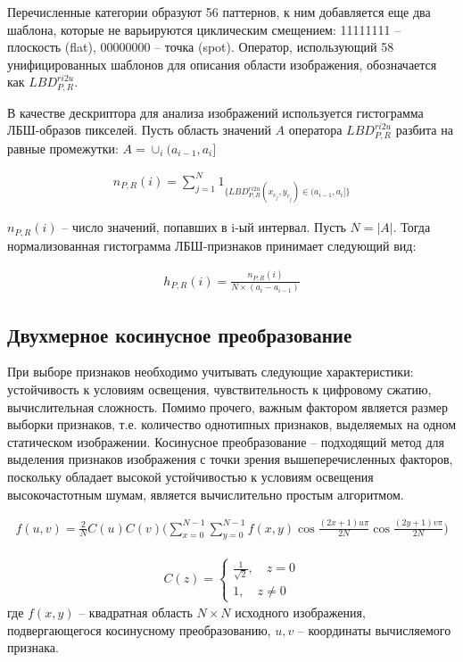 Перечисленные категории образуют 56 паттернов, к ним добавляется еще два шаблона,  которые  не  варьируются  циклическим  смещением:  11111111 --
плоскость  (flat),  00000000 -- точка  (spot).  Оператор,  использующий  58 унифицированных шаблонов для описания области изображения, обозначается как $LBD_{P,R}^{ri2u}$.

В качестве дескриптора для анализа изображений используется гистограмма ЛБШ-образов пикселей. Пусть область значений $A$ оператора $LBD_{P,R}^{ri2u}$ разбита на равные промежутки: 
$ A = \cup_i(a_{i-1},a_i]$

\begin{gather}
n_{P,R}(i)=\sum\limits_{j=1}^{N}1_{\{LBD_{P,R}^{ri2u}(x_{c_j},y_{c_j})\in(a_{i-1},a_i]\}}
\end{gather}

$n_{P,R}(i)$ -- число значений, попавших в i-ый интервал. Пусть $N = |A|$. Тогда нормализованная гистограмма ЛБШ-признаков принимает следующий вид:

\begin{gather}
h_{P,R}(i)=\frac{n_{P,R}(i)}{N \times (a_i - a_{i-1})}
\end{gather}

\subsection{Двухмерное косинусное преобразование}

При выборе признаков необходимо учитывать следующие характеристики: устойчивость к условиям освещения, чувствительность к цифровому сжатию, вычислительная сложность. Помимо прочего, важным фактором является размер выборки признаков, т.е. количество однотипных признаков, выделяемых на одном статическом изображении. Косинусное преобразование – подходящий метод для выделения признаков изображения с точки зрения вышеперечисленных факторов, поскольку обладает высокой устойчивостью к условиям освещения высокочастотным шумам, является вычислительно простым алгоритмом.

\begin{gather}
f(u, v) = \frac{2}{N} C(u)C(v)\Big(\sum\limits_{x=0}^{N-1}\sum\limits_{y=0}^{N-1}f(x, y) \cos \frac{(2x+1)u\pi}{2N} \cos \frac{(2y+1)v\pi}{2N} \Big)
\end{gather}

\begin{gather}
C(z) =
  \begin{cases}
    \frac{1}{\sqrt{2}}, \quad z = 0 \\
    1, \quad z \neq 0
 \end{cases}
\end{gather}
где $f(x, y)$ -- квадратная область $N \times N$ исходного изображения, подвергающегося
косинусному преобразованию, $u, v$ -- координаты вычисляемого признака.

